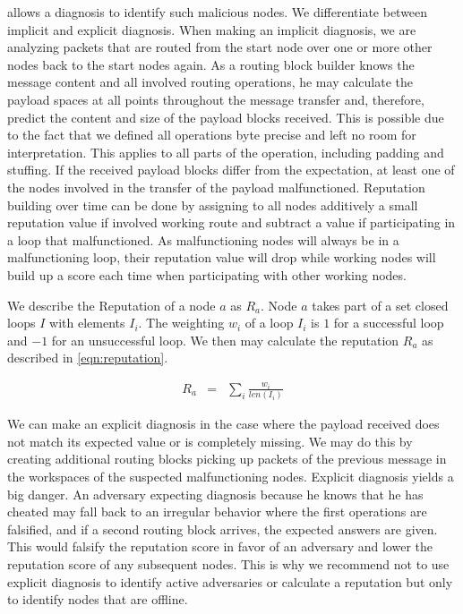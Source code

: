 \MessageVortex{} allows a diagnosis to identify such malicious nodes. We differentiate between implicit and explicit diagnosis. When making an implicit diagnosis, we are analyzing packets that are routed from the start node over one or more other nodes back to the start nodes again. As a routing block builder knows the message content and all involved routing operations, he may calculate the payload spaces at all points throughout the message transfer and, therefore, predict the content and size of the payload blocks received. This is possible due to the fact that we defined all operations byte precise and left no room for interpretation. This applies to all parts of the operation, including padding and stuffing. If the received payload blocks differ from the expectation, at least one of the nodes involved in the transfer of the payload malfunctioned. Reputation building over time can be done by assigning to all nodes additively a small reputation value if involved working route and subtract a value if participating in a loop that malfunctioned. As malfunctioning nodes will always be in a malfunctioning loop, their reputation value will drop while working nodes will build up a score each time when participating with other working nodes.

We describe the Reputation of a node $a$ as $R_a$. Node $a$ takes part of a set closed loops $I$ with elements $I_i$. The weighting $w_i$ of a loop $I_i$ is $1$ for a successful loop and $-1$ for an unsuccessful loop. We then may calculate the reputation $R_a$ as described in \cref{eqn:reputation}.

\begin{eqnarray}
	R_a & = & \sum_{i}{\frac{w_i}{len\left(I_i\right)}}\label{eqn:reputation}
\end{eqnarray} 

We can make an explicit diagnosis in the case where the payload received does not match its expected value or is completely missing. We may do this by creating additional routing blocks picking up packets of the previous message in the workspaces of the suspected malfunctioning nodes. Explicit diagnosis yields a big danger. An adversary expecting diagnosis because he knows that he has cheated may fall back to an irregular behavior where the first operations are falsified, and if a second routing block arrives, the expected answers are given. This would falsify the reputation score in favor of an adversary and lower the reputation score of any subsequent nodes. This is why we recommend not to use explicit diagnosis to identify active adversaries or calculate a reputation but only to identify nodes that are offline.

